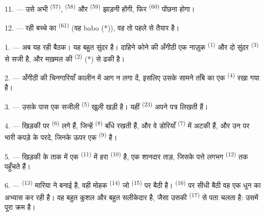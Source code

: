 

11. --- उसे अभी  \textsuperscript{(57)},
 \textsuperscript{(58)} और 
\textsuperscript{(59)} झाड़नी होंगी, फिर  \textsuperscript{(60)} पोंछना
होगा।

12. --- रही बच्चे का  \textsuperscript{(61)} (वह babo (*)), वह तो
पहले से तैयार है।

\VUsaut{5.0mm}
\VUsaut{3.0mm}

1. --- अब यह रही बैठक। यह बहुत सुंदर  है। दाहिने कोने की अँगीठी एक
नाज़ुक  \textsuperscript{(1)} और दो सुंदर 
\textsuperscript{(3)} से सजी है, और मख़मल की  \textsuperscript{(2)} (*)
से ढकी है।

2. --- अँगीठी की चिनगारियाँ कालीन में आग न लगा दें, इसलिए उसके सामने ताँबे का
एक  \textsuperscript{(4)} रखा गया है।

3. --- उसके पास एक सजीली  \textsuperscript{(5)} खुली खड़ी है।
यहीं  \textsuperscript{(23)} अपने पत्र लिखती हैं।

4. --- खिड़की पर  \textsuperscript{(6)} लगे हैं, जिन्हें 
\textsuperscript{(8)} बाँधे रखती हैं, और वे डोरियाँ 
\textsuperscript{(7)} में अटकी हैं, और उन पर भारी कपड़े के परदे, जिनके ऊपर एक
 \textsuperscript{(9)} है।

5. --- खिड़की के ताक में एक  \textsuperscript{(11)} में हरा
 \textsuperscript{(10)} है, एक शानदार ताड़, जिसके पत्ते लगभग
 \textsuperscript{(12)} तक पहुँचते हैं।

6. ---  \textsuperscript{(13)} मारिया ने बनाई है, वही मोहक
 \textsuperscript{(14)} जो  \textsuperscript{(15)} पर
बैठी है।  \textsuperscript{(16)} पर सीधी बैठी वह एक धुन का अभ्यास कर
रही है। वह बहुत कुशल और बहुत सलीकेदार है, जैसा उसकी
 \textsuperscript{(17)} से पता चलता है: उसमें पूरा
क्रम है।

